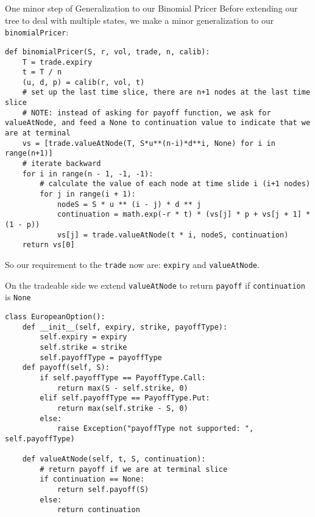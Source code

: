 \begin{frame}[fragile]{One minor step of Generalization to our Binomial Pricer}
Before extending our tree to deal with multiple states, we make a minor generalization to our \verb_binomialPricer_:
\begin{lstlisting}
def binomialPricer(S, r, vol, trade, n, calib):
    T = trade.expiry
    t = T / n
    (u, d, p) = calib(r, vol, t)
    # set up the last time slice, there are n+1 nodes at the last time slice
    # NOTE: instead of asking for payoff function, we ask for valueAtNode, and feed a None to continuation value to indicate that we are at terminal
    vs = [trade.valueAtNode(T, S*u**(n-i)*d**i, None) for i in range(n+1)]
    # iterate backward
    for i in range(n - 1, -1, -1):
        # calculate the value of each node at time slide i (i+1 nodes)
        for j in range(i + 1):
            nodeS = S * u ** (i - j) * d ** j
            continuation = math.exp(-r * t) * (vs[j] * p + vs[j + 1] * (1 - p))
            vs[j] = trade.valueAtNode(t * i, nodeS, continuation)
    return vs[0]
\end{lstlisting}
So our requirement to the \verb_trade_ now are: \verb_expiry_ and \verb_valueAtNode_.
\end{frame}

\begin{frame}[fragile]
On the tradeable side we extend \verb_valueAtNode_ to return \verb_payoff_ if \verb_continuation_ is \verb_None_
\begin{lstlisting}
class EuropeanOption():
    def __init__(self, expiry, strike, payoffType):
        self.expiry = expiry
        self.strike = strike
        self.payoffType = payoffType
    def payoff(self, S):
        if self.payoffType == PayoffType.Call:
            return max(S - self.strike, 0)
        elif self.payoffType == PayoffType.Put:
            return max(self.strike - S, 0)
        else:
            raise Exception("payoffType not supported: ", self.payoffType)

    def valueAtNode(self, t, S, continuation):
        # return payoff if we are at terminal slice
        if continuation == None:
            return self.payoff(S)
        else:
            return continuation
\end{lstlisting}
\end{frame}


